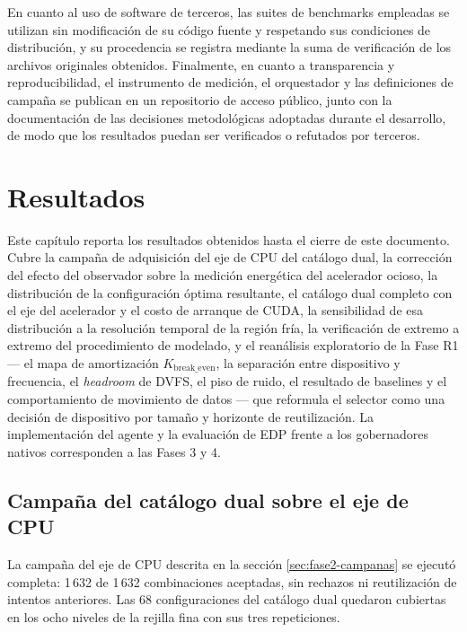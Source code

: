 \documentclass[12pt,oneside,spanish]{book}
\begin{document}
En cuanto al uso de software de terceros, las suites de benchmarks empleadas se utilizan sin modificación de su código fuente y respetando sus condiciones de distribución, y su procedencia se registra mediante la suma de verificación de los archivos originales obtenidos. Finalmente, en cuanto a transparencia y reproducibilidad, el instrumento de medición, el orquestador y las definiciones de campaña se publican en un repositorio de acceso público, junto con la documentación de las decisiones metodológicas adoptadas durante el desarrollo, de modo que los resultados puedan ser verificados o refutados por terceros.


\chapter{Resultados}

Este capítulo reporta los resultados obtenidos hasta el cierre de este documento. Cubre la campaña de adquisición del eje de CPU del catálogo dual, la corrección del efecto del observador sobre la medición energética del acelerador ocioso, la distribución de la configuración óptima resultante, el catálogo dual completo con el eje del acelerador y el costo de arranque de CUDA, la sensibilidad de esa distribución a la resolución temporal de la región fría, la verificación de extremo a extremo del procedimiento de modelado, y el reanálisis exploratorio de la Fase R1 --- el mapa de amortización $K_{\text{break\_even}}$, la separación entre dispositivo y frecuencia, el \textit{headroom} de DVFS, el piso de ruido, el resultado de baselines y el comportamiento de movimiento de datos --- que reformula el selector como una decisión de dispositivo por tamaño y horizonte de reutilización. La implementación del agente y la evaluación de EDP frente a los gobernadores nativos corresponden a las Fases 3 y 4.

\section{Campaña del catálogo dual sobre el eje de CPU}
\label{sec:resultados-campana-dual}

La campaña del eje de CPU descrita en la sección \ref{sec:fase2-campanas} se ejecutó completa: 1\,632 de 1\,632 combinaciones aceptadas, sin rechazos ni reutilización de intentos anteriores. Las 68 configuraciones del catálogo dual quedaron cubiertas en los ocho niveles de la rejilla fina con sus tres repeticiones.
\end{document}
